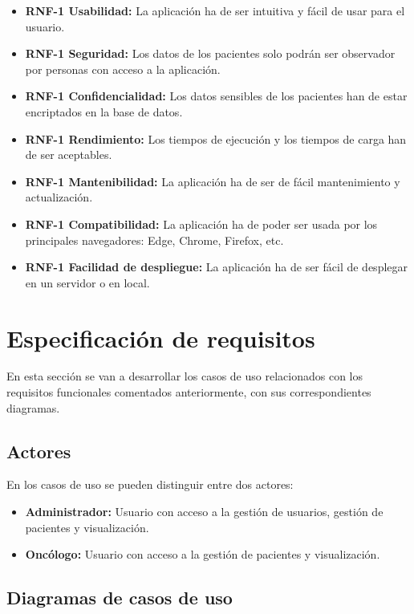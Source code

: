 \begin{itemize}
    \item \textbf{RNF-1 Usabilidad:} La aplicación ha de ser intuitiva y fácil de usar para el usuario.
    \item \textbf{RNF-1 Seguridad:} Los datos de los pacientes solo podrán ser observador por personas con acceso a la aplicación.
    \item \textbf{RNF-1 Confidencialidad:} Los datos sensibles de los pacientes han de estar encriptados en la base de datos.
    \item \textbf{RNF-1 Rendimiento:} Los tiempos de ejecución y los tiempos de carga han de ser aceptables.
    \item \textbf{RNF-1 Mantenibilidad:} La aplicación ha de ser de fácil mantenimiento y actualización.
    \item \textbf{RNF-1 Compatibilidad:} La aplicación ha de poder ser usada por los principales navegadores: Edge, Chrome, Firefox, etc.
    \item \textbf{RNF-1 Facilidad de despliegue:} La aplicación ha de ser fácil de desplegar en un servidor o en local.
\end{itemize}

\section{Especificación de requisitos}

En esta sección se van a desarrollar los casos de uso relacionados con los requisitos funcionales comentados anteriormente, con sus correspondientes diagramas.

\subsection{Actores}

En los casos de uso se pueden distinguir entre dos actores:

\begin{itemize}
    \item \textbf{Administrador:} Usuario con acceso a la gestión de usuarios, gestión de pacientes y visualización.
    \item \textbf{Oncólogo:} Usuario con acceso a la gestión de pacientes y visualización.
\end{itemize}

\subsection{Diagramas de casos de uso}

